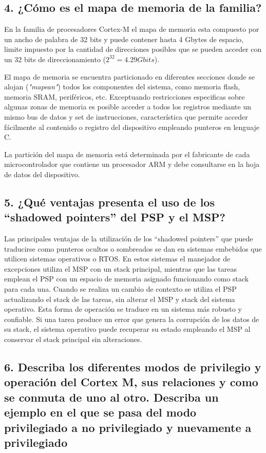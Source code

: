 \documentclass[10pt,a4paper,twoside,spanish]{article}	%
\begin{document}
\subsection*{4. ¿Cómo es el mapa de memoria de la familia?}

En la familia de procesadores Cortex-M el mapa de memoria esta compuesto por un ancho de palabra de 32 bits y puede contener hasta 4 Gbytes de espacio, limite impuesto por la cantidad de direcciones posibles que se pueden acceder con un 32 bits de direccionamiento ($2^{32}=4.29 Gbits$).

El mapa de memoria se encuentra particionado en diferentes secciones donde se alojan (\textit{"mapean"}) todos los componentes del sistema, como memoria flash, memoria SRAM, periféricos, etc. Exceptuando restricciones especificas sobre algunas zonas de memoria es posible acceder a todos los registros mediante un mismo bus de datos y set de instrucciones, característica que permite acceder fácilmente al contenido o registro del dispositivo empleando punteros en lenguaje C.  

La partición del mapa de memoria está determinada por el fabricante de cada microcontrolador que contiene un procesador ARM y debe consultarse en la hoja de datos del dispositivo.

\subsection*{5. ¿Qué ventajas presenta el uso de los “shadowed pointers” del PSP y el MSP?}

Las principales ventajas de la utilización de los “shadowed pointers” que puede traducirse como punteros ocultos o sombreados se dan en sistemas embebidos que utilicen sistemas operativos o RTOS. En estos sistemas el manejador de excepciones utiliza el MSP con un stack principal, mientras que las tareas emplean el PSP con un espacio de memoria asignado funcionando como stack para cada una. Cuando se realiza un cambio de contexto se utiliza el PSP  actualizando el stack de las tareas, sin alterar el MSP y stack del sistema operativo.
Esta forma de operación se traduce en un sistema más robusto y confiable. Si una tarea produce un error que genera la corrupción de los datos de su stack, el sistema operativo puede recuperar su estado empleando el MSP al conservar el stack principal sin alteraciones.


\subsection*{6. Describa los diferentes modos de privilegio y operación del Cortex M, sus relaciones y como se conmuta de uno al otro. Describa un ejemplo en el que se pasa del modo privilegiado a no privilegiado y nuevamente a privilegiado}
\end{document}
